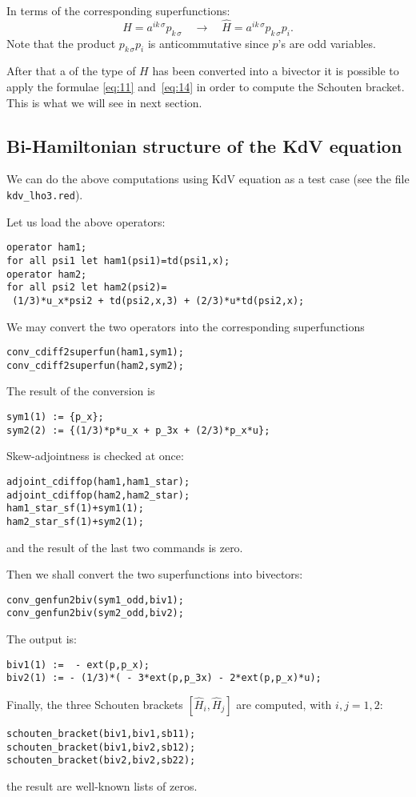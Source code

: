 In terms of the corresponding superfunctions:
\begin{displaymath}
  H = a^{ik\,\sigma} p_{k\,\sigma} \quad \to \quad
  \hat H = a^{ik\,\sigma} p_{k\,\sigma}p_i.
\end{displaymath}
Note that the product $p_{k\,\sigma}p_i$ is anticommutative since $p$'s are odd
variables.

After that a \cdiffop of the type of $H$ has been converted into a bivector it
is possible to apply the formulae \eqref{eq:11} and~\eqref{eq:14} in order to
compute the Schouten bracket. This is what we will see in next section.


\subsection{Bi-Hamiltonian structure of the KdV equation}
\label{cdesec:bi-hamilt-struct}

We can do the above computations using KdV equation as a test case (see the
file \texttt{kdv\_lho3.red}).

Let us load the above operators:
\begin{verbatim}
operator ham1;
for all psi1 let ham1(psi1)=td(psi1,x);
operator ham2;
for all psi2 let ham2(psi2)=
 (1/3)*u_x*psi2 + td(psi2,x,3) + (2/3)*u*td(psi2,x);
\end{verbatim}
We may convert the two operators into the corresponding superfunctions
\begin{verbatim}
conv_cdiff2superfun(ham1,sym1);
conv_cdiff2superfun(ham2,sym2);
\end{verbatim}
The result of the conversion is
\begin{verbatim}
sym1(1) := {p_x};
sym2(2) := {(1/3)*p*u_x + p_3x + (2/3)*p_x*u};
\end{verbatim}
Skew-adjointness is checked at once:
\begin{verbatim}
adjoint_cdiffop(ham1,ham1_star);
adjoint_cdiffop(ham2,ham2_star);
ham1_star_sf(1)+sym1(1);
ham2_star_sf(1)+sym2(1);
\end{verbatim}
and the result of the last two commands is zero.

Then we shall convert the two superfunctions into bivectors:
\begin{verbatim}
conv_genfun2biv(sym1_odd,biv1);
conv_genfun2biv(sym2_odd,biv2);
\end{verbatim}
The output is:
\begin{verbatim}
biv1(1) :=  - ext(p,p_x);
biv2(1) := - (1/3)*( - 3*ext(p,p_3x) - 2*ext(p,p_x)*u);
\end{verbatim}
Finally, the three Schouten brackets $[\hat H_i,\hat H_j]$ are computed, with
$i,j=1,2$:
\begin{verbatim}
schouten_bracket(biv1,biv1,sb11);
schouten_bracket(biv1,biv2,sb12);
schouten_bracket(biv2,biv2,sb22);
\end{verbatim}
the result are well-known lists of zeros.

